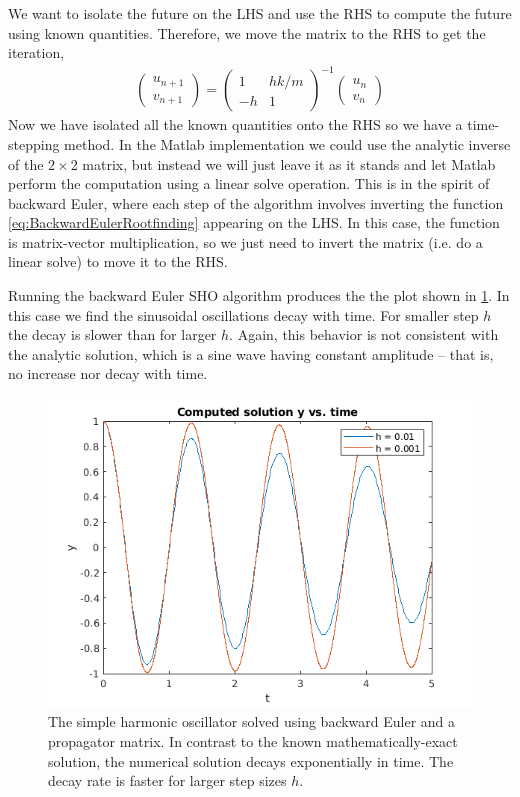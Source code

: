 \documentclass[hidelinks,notitlepage]{book}
\begin{document}
We want to isolate the future on the LHS and use the RHS to compute the future using known quantities.  Therefore, we move the matrix to the RHS to get the iteration,
\begin{align}
\label{eq:BackwardEulerMatrixInverse}
\begin{pmatrix}
u_{n+1}  \\
v_{n+1} 
\end{pmatrix} = 
\begin{pmatrix}
1 & h k / m \\
-h & 1
\end{pmatrix}^{-1}
\begin{pmatrix}
u_{n}  \\
v_{n} 
\end{pmatrix}
\end{align}
Now we have isolated all the known quantities onto the RHS so we have a time-stepping method.  In the Matlab implementation we could use the analytic inverse of the $2 \times 2$ matrix, but instead we will just leave it as it stands and let Matlab perform the computation using a linear solve operation.  This is in the spirit of backward Euler, where each step of the algorithm involves inverting the function \cref{eq:BackwardEulerRootfinding} appearing on the LHS.  In this case, the function is matrix-vector multiplication, so we just need to invert the matrix (i.e. do a linear solve) to move it to the RHS.

Running the backward Euler SHO algorithm produces the the plot shown in \cref{fig:BackwardEulerSHOPropagator}.  In this case we find the sinusoidal oscillations decay with time.  For smaller step $h$ the decay is slower than for larger $h$.  Again, this behavior is not consistent with the analytic solution, which is a sine wave having constant amplitude -- that is, no increase nor decay with time.
\begin{figure}[tbh]
	\centering
	\includegraphics[width=0.7\columnwidth]{BackwardEulerSHOPropagator.png}
	\caption{The simple harmonic oscillator solved using backward Euler and a propagator matrix.  In contrast to the known mathematically-exact solution, the numerical solution decays exponentially in time.  The decay rate is faster for larger step sizes $h$.}
	\label{fig:BackwardEulerSHOPropagator}
\end{figure}
\end{document}
